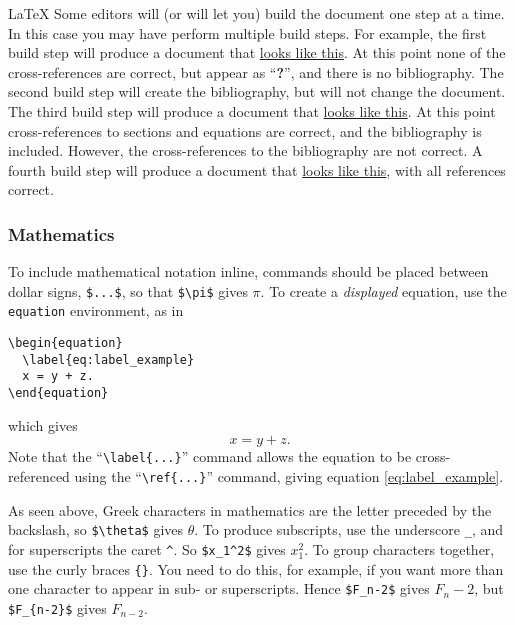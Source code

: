 \begin{chapter}{\LaTeX}
Some editors will (or will let you) build the document one step at a time. In this case you may have perform multiple build steps. For example, the first build step will produce a document that \href{https://raw.githubusercontent.com/IanHawke/maths-with-python/master/latex/BasicLatexBibtex_pass1.pdf}{looks like this}. At this point none of the cross-references are correct, but appear as ``\textbf{?}'', and there is no bibliography. The second build step will create the bibliography, but will not change the document. The third build step will produce a document that \href{https://raw.githubusercontent.com/IanHawke/maths-with-python/master/latex/BasicLatexBibtex_pass2.pdf}{looks like this}. At this point cross-references to sections and equations are correct, and the bibliography is included. However, the cross-references to the bibliography are not correct. A fourth build step will produce a document that \href{https://raw.githubusercontent.com/IanHawke/maths-with-python/master/latex/BasicLatexBibtex_pass3.pdf}{looks like this}, with all references correct.

\subsubsection{Mathematics}

To include mathematical notation inline, commands should be placed between dollar signs, \verb|$...$|, so that \verb|$\pi$| gives $\pi$. To create a \emph{displayed} equation, use the \texttt{equation} environment, as in
%
\begin{verbatim}
\begin{equation}
  \label{eq:label_example}
  x = y + z.
\end{equation}
\end{verbatim}
%
which gives
%
\begin{equation}
  \label{eq:label_example}
  x = y + z.
\end{equation}
%
Note that the ``\verb|\label{...}|'' command allows the equation to be cross-referenced using the ``\verb|\ref{...}|'' command, giving equation \ref{eq:label_example}.

As seen above, Greek characters in mathematics are the letter preceded by the backslash, so \verb|$\theta$| gives $\theta$. To produce subscripts, use the underscore \verb|_|, and for superscripts the caret \verb|^|. So \verb|$x_1^2$| gives $x_1^2$. To group characters together, use the curly braces \verb|{}|. You need to do this, for example, if you want more than one character to appear in sub- or superscripts. Hence \verb|$F_n-2$| gives $F_n-2$, but \verb|$F_{n-2}$| gives $F_{n-2}$.


\end{chapter}
